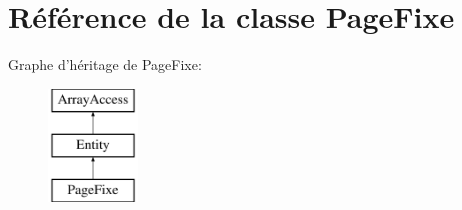 \hypertarget{class_library_1_1_entities_1_1_page_fixe}{\section{Référence de la classe Page\+Fixe}
\label{class_library_1_1_entities_1_1_page_fixe}
}
Graphe d'héritage de Page\+Fixe\+:\begin{figure}[H]
\begin{center}
\leavevmode
\includegraphics[height=3.000000cm]{class_library_1_1_entities_1_1_page_fixe}
\end{center}
\end{figure}
